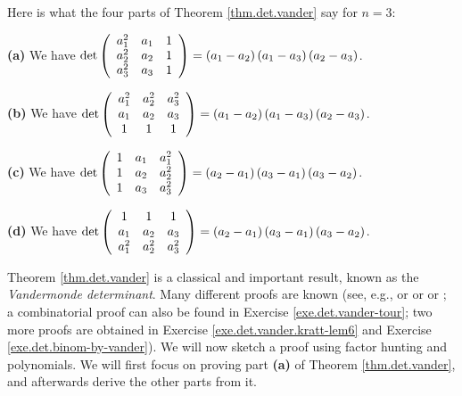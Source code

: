 \begin{example}
Here is what the four parts of Theorem \ref{thm.det.vander} say for $n=3$:
\medskip

\textbf{(a)} We have $\det\left(
\begin{array}
[c]{ccc}%
a_{1}^{2} & a_{1} & 1\\
a_{2}^{2} & a_{2} & 1\\
a_{3}^{2} & a_{3} & 1
\end{array}
\right)  =\left(  a_{1}-a_{2}\right)  \left(  a_{1}-a_{3}\right)  \left(
a_{2}-a_{3}\right)  $. \medskip

\textbf{(b)} We have $\det\left(
\begin{array}
[c]{ccc}%
a_{1}^{2} & a_{2}^{2} & a_{3}^{2}\\
a_{1} & a_{2} & a_{3}\\
1 & 1 & 1
\end{array}
\right)  =\left(  a_{1}-a_{2}\right)  \left(  a_{1}-a_{3}\right)  \left(
a_{2}-a_{3}\right)  $. \medskip

\textbf{(c)} We have $\det\left(
\begin{array}
[c]{ccc}%
1 & a_{1} & a_{1}^{2}\\
1 & a_{2} & a_{2}^{2}\\
1 & a_{3} & a_{3}^{2}%
\end{array}
\right)  =\left(  a_{2}-a_{1}\right)  \left(  a_{3}-a_{1}\right)  \left(
a_{3}-a_{2}\right)  $. \medskip

\textbf{(d)} We have $\det\left(
\begin{array}
[c]{ccc}%
1 & 1 & 1\\
a_{1} & a_{2} & a_{3}\\
a_{1}^{2} & a_{2}^{2} & a_{3}^{2}%
\end{array}
\right)  =\left(  a_{2}-a_{1}\right)  \left(  a_{3}-a_{1}\right)  \left(
a_{3}-a_{2}\right)  $.
\end{example}

Theorem \ref{thm.det.vander} is a classical and important result, known as the
\emph{Vandermonde determinant}. Many different proofs are known (see, e.g.,
\cite[Theorem 6.46]{detnotes} or \cite[\S 5.3]{Aigner07} or \cite[Section
III.8.6, Example (1)]{Bourba74} or \cite[Theorem 1]{GriHyp}; a combinatorial
proof can also be found in Exercise \ref{exe.det.vander-tour}; two more proofs
are obtained in Exercise \ref{exe.det.vander.kratt-lem6} and Exercise
\ref{exe.det.binom-by-vander}). We will now sketch a proof using factor
hunting and polynomials. We will first focus on proving part \textbf{(a)} of
Theorem \ref{thm.det.vander}, and afterwards derive the other parts from it.

